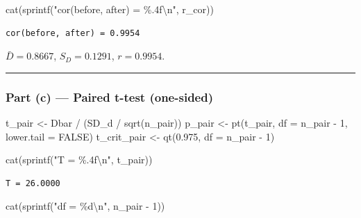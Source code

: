 \documentclass[
  letterpaper,
  DIV=11,
  numbers=noendperiod]{scrartcl}
\newenvironment{Shaded}{\begin{snugshade}}{\end{snugshade}}
\newcommand{\AttributeTok}[1]{\textcolor[rgb]{0.40,0.45,0.13}{#1}}
\newcommand{\ConstantTok}[1]{\textcolor[rgb]{0.56,0.35,0.01}{#1}}
\newcommand{\DecValTok}[1]{\textcolor[rgb]{0.68,0.00,0.00}{#1}}
\newcommand{\FloatTok}[1]{\textcolor[rgb]{0.68,0.00,0.00}{#1}}
\newcommand{\FunctionTok}[1]{\textcolor[rgb]{0.28,0.35,0.67}{#1}}
\newcommand{\NormalTok}[1]{\textcolor[rgb]{0.00,0.23,0.31}{#1}}
\newcommand{\OtherTok}[1]{\textcolor[rgb]{0.00,0.23,0.31}{#1}}
\newcommand{\SpecialCharTok}[1]{\textcolor[rgb]{0.37,0.37,0.37}{#1}}
\newcommand{\StringTok}[1]{\textcolor[rgb]{0.13,0.47,0.30}{#1}}
\begin{document}
\begin{Shaded}
\begin{Highlighting}[]
\FunctionTok{cat}\NormalTok{(}\FunctionTok{sprintf}\NormalTok{(}\StringTok{"cor(before, after) = \%.4f}\SpecialCharTok{\textbackslash{}n}\StringTok{"}\NormalTok{, r\_cor))}
\end{Highlighting}
\end{Shaded}

\begin{verbatim}
cor(before, after) = 0.9954
\end{verbatim}

\(\bar{D} = 0.8667\), \(S_D = 0.1291\), \(r = 0.9954\).

\begin{center}\rule{0.5\linewidth}{0.5pt}\end{center}

\subsubsection{Part (c) --- Paired t-test
(one-sided)}\label{part-c-paired-t-test-one-sided}

\begin{Shaded}
\begin{Highlighting}[]
\NormalTok{t\_pair }\OtherTok{\textless{}{-}}\NormalTok{ Dbar }\SpecialCharTok{/}\NormalTok{ (SD\_d }\SpecialCharTok{/} \FunctionTok{sqrt}\NormalTok{(n\_pair))}
\NormalTok{p\_pair }\OtherTok{\textless{}{-}} \FunctionTok{pt}\NormalTok{(t\_pair, }\AttributeTok{df =}\NormalTok{ n\_pair }\SpecialCharTok{{-}} \DecValTok{1}\NormalTok{, }\AttributeTok{lower.tail =} \ConstantTok{FALSE}\NormalTok{)}
\NormalTok{t\_crit\_pair }\OtherTok{\textless{}{-}} \FunctionTok{qt}\NormalTok{(}\FloatTok{0.975}\NormalTok{, }\AttributeTok{df =}\NormalTok{ n\_pair }\SpecialCharTok{{-}} \DecValTok{1}\NormalTok{)}

\FunctionTok{cat}\NormalTok{(}\FunctionTok{sprintf}\NormalTok{(}\StringTok{"T = \%.4f}\SpecialCharTok{\textbackslash{}n}\StringTok{"}\NormalTok{, t\_pair))}
\end{Highlighting}
\end{Shaded}

\begin{verbatim}
T = 26.0000
\end{verbatim}

\begin{Shaded}
\begin{Highlighting}[]
\FunctionTok{cat}\NormalTok{(}\FunctionTok{sprintf}\NormalTok{(}\StringTok{"df = \%d}\SpecialCharTok{\textbackslash{}n}\StringTok{"}\NormalTok{, n\_pair }\SpecialCharTok{{-}} \DecValTok{1}\NormalTok{))}
\end{Highlighting}
\end{Shaded}
\end{document}
